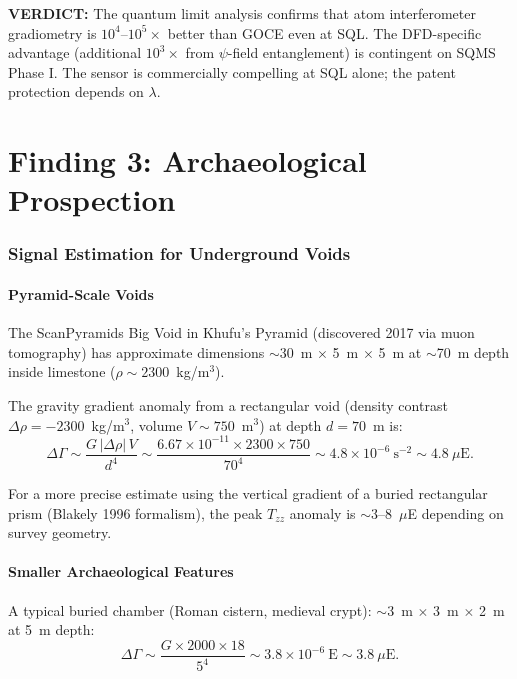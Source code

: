 \documentclass[11pt]{article}
\theoremstyle{definition}
\theoremstyle{remark}
\newcommand{\ee}[1]{\times10^{#1}}
\newcommand{\verdict}[1]{\textcolor{green!50!black}{\textbf{VERDICT:} #1}}
\begin{document}
\verdict{The quantum limit analysis confirms that atom interferometer
gradiometry is $10^4$--$10^5\times$ better than GOCE even at SQL. The
DFD-specific advantage (additional $10^3\times$ from $\psi$-field
entanglement) is contingent on SQMS Phase I. The sensor is commercially
compelling at SQL alone; the patent protection depends on $\lambda$.}

\part{Finding 3: Archaeological Prospection}
\label{part:archaeology}

\section{Signal Estimation for Underground Voids}

\subsection{Pyramid-Scale Voids}

The ScanPyramids Big Void in Khufu's Pyramid (discovered 2017 via muon
tomography) has approximate dimensions $\sim$30~m $\times$ 5~m $\times$ 5~m
at $\sim$70~m depth inside limestone ($\rho \sim 2300$~kg/m$^3$).

The gravity gradient anomaly from a rectangular void (density contrast
$\Delta\rho = -2300$~kg/m$^3$, volume $V \sim 750$~m$^3$) at depth
$d = 70$~m is:
\begin{equation}
  \Delta\Gamma \sim \frac{G \, |\Delta\rho| \, V}{d^4}
  \sim \frac{6.67\ee{-11} \times 2300 \times 750}{70^4}
  \sim 4.8\ee{-6}~\text{s}^{-2} \sim 4.8~\mu\text{E}.
\end{equation}

For a more precise estimate using the vertical gradient of a buried
rectangular prism (Blakely 1996 formalism), the peak $T_{zz}$ anomaly
is $\sim$3--8~$\mu$E depending on survey geometry.

\subsection{Smaller Archaeological Features}

A typical buried chamber (Roman cistern, medieval crypt):
$\sim$3~m $\times$ 3~m $\times$ 2~m at 5~m depth:
\begin{equation}
  \Delta\Gamma \sim \frac{G \times 2000 \times 18}{5^4}
  \sim 3.8\ee{-6}~\text{E} \sim 3.8~\mu\text{E}.
\end{equation}
\end{document}
